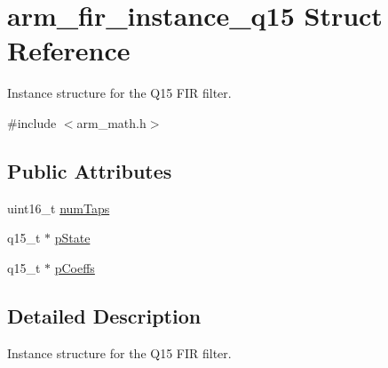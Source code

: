 \hypertarget{structarm__fir__instance__q15}{\section{arm\-\_\-fir\-\_\-instance\-\_\-q15 Struct Reference}
\label{structarm__fir__instance__q15}
}


Instance structure for the Q15 F\-I\-R filter.  




{\ttfamily \#include $<$arm\-\_\-math.\-h$>$}

\subsection*{Public Attributes}
\begin{DoxyCompactItemize}
\item 
uint16\-\_\-t \hyperlink{structarm__fir__instance__q15_a0e46f93cf51bfb18b1be808be9c5bfc9}{num\-Taps}
\item 
q15\-\_\-t $\ast$ \hyperlink{structarm__fir__instance__q15_aa8d25f44f45b6a6c4cf38c31569b8a01}{p\-State}
\item 
q15\-\_\-t $\ast$ \hyperlink{structarm__fir__instance__q15_a6d16db16a5f8f0db54938f2967244d9e}{p\-Coeffs}
\end{DoxyCompactItemize}


\subsection{Detailed Description}
Instance structure for the Q15 F\-I\-R filter. 

